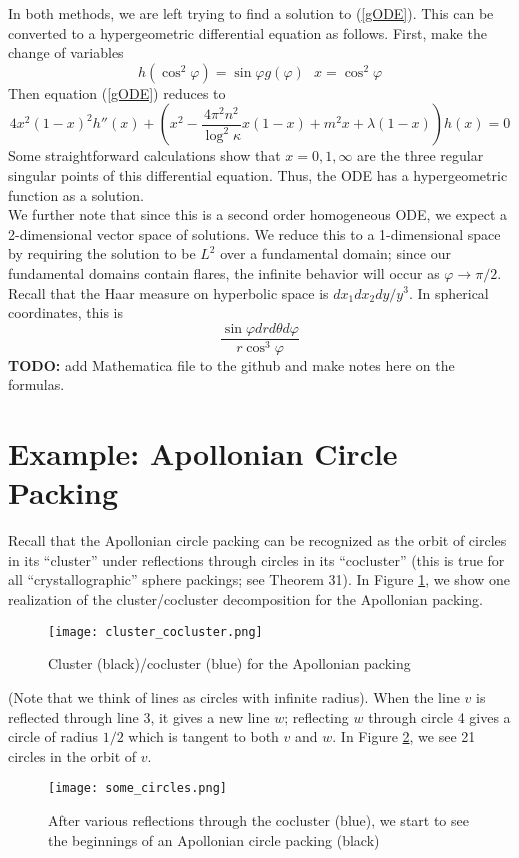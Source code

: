 \documentclass[]{article}
\begin{document}
In both methods, we are left trying to find a solution to (\ref{gODE}).
This can be converted to a hypergeometric differential equation as follows.
First, make the change of variables
$$
h(\cos^2\varphi) = \sin\varphi g(\varphi) ~~~ x = \cos^2\varphi
$$
Then equation (\ref{gODE}) reduces to
$$
4x^2(1 - x)^2h''(x) + \left( x^2 - \frac{4\pi^2n^2}{\log^2\kappa}x(1 - x) + m^2x + \lambda(1 - x) \right)h(x) = 0
$$
Some straightforward calculations show that $x = 0, 1, \infty$ are the three regular singular points of this differential equation.
Thus, the ODE has a hypergeometric function as a solution.
\\

We further note that since this is a second order homogeneous ODE, we expect a 2-dimensional vector space of solutions.
We reduce this to a 1-dimensional space by requiring the solution to be $L^2$ over a fundamental domain; since our fundamental domains contain flares, the infinite behavior will occur as $\varphi \rightarrow \pi/2$.
Recall that the Haar measure on hyperbolic space is $dx_1dx_2dy/y^3$.
In spherical coordinates, this is
$$
\frac{\sin\varphi drd\theta d\varphi}{r\cos^3\varphi}
$$
\textbf{TODO:} add Mathematica file to the github and make notes here on the formulas.

\section*{Example: Apollonian Circle Packing}

Recall that the Apollonian circle packing can be recognized as the orbit of circles in its ``cluster'' under reflections through circles in its ``cocluster'' (this is true for all ``crystallographic'' sphere packings; see \cite{kontorovich2017geometry} Theorem 31).
In Figure \ref{c_coc}, we show one realization of the cluster/cocluster decomposition for the Apollonian packing.
\begin{figure}[h]
	\centering
	\texttt{[image: cluster\_cocluster.png]}
	\caption{Cluster (black)/cocluster (blue) for the Apollonian packing}
	\label{c_coc}
\end{figure}
(Note that we think of lines as circles with infinite radius).
When the line $v$ is reflected through line 3, it gives a new line $w$; reflecting $w$ through circle 4 gives a circle of radius $1/2$ which is tangent to both $v$ and $w$.
In Figure \ref{orbit}, we see 21 circles in the orbit of $v$.
\begin{figure}[h]
	\centering
	\texttt{[image: some\_circles.png]}
	\caption{After various reflections through the cocluster (blue), we start to see the beginnings of an Apollonian circle packing (black)}
	\label{orbit}
\end{figure}
\end{document}
